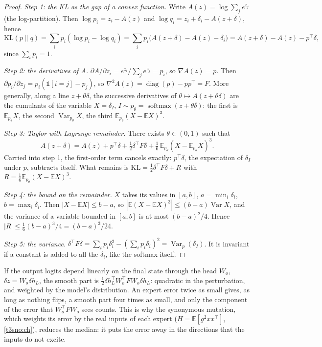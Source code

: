 \begin{proof}
\emph{Step 1: the KL as the gap of a convex function.} Write $A(z) = \log \sum_j e^{z_j}$ (the log-partition). Then $\log p_i = z_i - A(z)$ and $\log q_i = z_i + \delta_i - A(z + \delta)$, hence
\[
\mathrm{KL}(p\|q) = \sum_i p_i (\log p_i - \log q_i) = \sum_i p_i \bigl(A(z+\delta) - A(z) - \delta_i\bigr) = A(z + \delta) - A(z) - p^{\top}\delta,
\]
since $\sum_i p_i = 1$.

\emph{Step 2: the derivatives of $A$.} $\partial A/\partial z_i = e^{z_i}/\sum_j e^{z_j} = p_i$, so $\nabla A(z) = p$. Then $\partial p_i/\partial z_j = p_i(\mathbb{1}[i=j] - p_j)$, so $\nabla^2 A(z) = \operatorname{diag}(p) - p p^{\top} = F$. More generally, along a line $z + \theta\delta$, the successive derivatives of $\theta \mapsto A(z + \theta\delta)$ are the cumulants of the variable $X = \delta_I$, $I \sim p_\theta = \operatorname{softmax}(z + \theta\delta)$: the first is $\mathbb{E}_{p_\theta}X$, the second $\operatorname{Var}_{p_\theta}X$, the third $\mathbb{E}_{p_\theta}(X - \mathbb{E}X)^3$.

\emph{Step 3: Taylor with Lagrange remainder.} There exists $\theta \in (0, 1)$ such that
\[
A(z+\delta) = A(z) + p^{\top}\delta + \tfrac12 \delta^{\top}F\delta + \tfrac16\, \mathbb{E}_{p_\theta}(X - \mathbb{E}_{p_\theta}X)^3.
\]
Carried into step 1, the first-order term cancels exactly: $p^{\top}\delta$, the expectation of $\delta_I$ under $p$, subtracts itself. What remains is $\mathrm{KL} = \frac12\delta^{\top}F\delta + R$ with $R = \frac16\mathbb{E}_{p_\theta}(X - \mathbb{E}X)^3$.

\emph{Step 4: the bound on the remainder.} $X$ takes its values in $[a, b]$, $a = \min_i\delta_i$, $b = \max_i\delta_i$. Then $|X - \mathbb{E}X| \le b - a$, so $|\mathbb{E}(X-\mathbb{E}X)^3| \le (b-a)\operatorname{Var}X$, and the variance of a variable bounded in $[a,b]$ is at most $(b-a)^2/4$. Hence $|R| \le \frac16 (b-a)^3/4 = (b-a)^3/24$.

\emph{Step 5: the variance.} $\delta^{\top}F\delta = \sum_i p_i\delta_i^2 - (\sum_i p_i\delta_i)^2 = \operatorname{Var}_p(\delta_I)$. It is invariant if a constant is added to all the $\delta_i$, like the softmax itself.
\end{proof}

\begin{remarque}\label{t3syn:rem:lisse}
If the output logits depend linearly on the final state through the head $W_o$, $\delta z = W_o \delta h_L$, the smooth part is $\frac12 \delta h_L^{\top} W_o^{\top} F W_o \delta h_L$: quadratic in the perturbation, and weighted by the model's distribution. An expert error twice as small gives, as long as nothing flips, a smooth part four times as small, and only the component of the error that $W_o^{\top}FW_o$ sees counts. This is why the synonymous mutation, which weights its error by the real inputs of each expert ($H = \mathbb{E}[g^2 x x^{\top}]$, \cref{t3sno:ch}), reduces the median: it puts the error away in the directions that the inputs do not excite.
\end{remarque}

